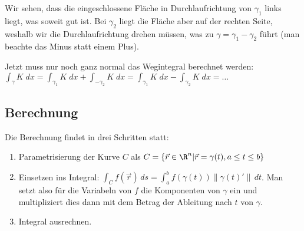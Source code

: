Wir sehen, dass die eingeschlossene Fläche in Durchlaufrichtung von $\gamma_1$
links liegt, was soweit gut ist. Bei $\gamma_2$ liegt die Fläche aber auf der
rechten Seite, weshalb wir die Durchlaufrichtung drehen müssen, was zu $\gamma
= \gamma_1 - \gamma_2$ führt (man beachte das Minus statt einem Plus).

Jetzt muss nur noch ganz normal das Wegintegral berechnet werden: $\int_\gamma
K\;dx = \int_{\gamma_1} K\;dx + \int_{-\gamma_2} K\;dx = \int_{\gamma_1} K\;dx -
\int_{\gamma_2} K\;dx = \ldots$

\subsection{Berechnung}
Die Berechnung findet in drei Schritten statt:
\begin{enumerate}[leftmargin=*]
	\item Parametrisierung der Kurve $C$ als $C = \{\vec{r} \in \R^n | \vec{r} = \gamma(t), a \leq t \leq b\}$
	\item Einsetzen ins Integral: $\int_C f(\vec{r})\,ds = \int_a^b f(\gamma(t)) \|\gamma(t)'\|\,dt$.
	Man setzt also für die Variabeln von $f$ die Komponenten von $\gamma$ ein und
	multipliziert dies dann mit dem Betrag der Ableitung nach $t$ von $\gamma$.
	\item Integral ausrechnen.
\end{enumerate}
